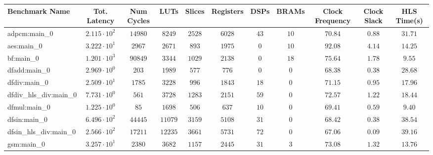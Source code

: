 \begin{tabular}{|l|c|c|c|c|c|c|c|c|c|c|}
\hline
Benchmark Name          & Tot. Latency           & Num Cycles & LUTs      & Slices    & Registers & DSPs    & BRAMs   & Clock Frequency & Clock Slack & HLS Time(s) \\
\hline
adpcm:main\_0           & $ 2.115 \cdot 10^{2} $ & $ 14980  $ & $ 8249  $ & $ 2528  $ & $ 6028  $ & $ 43  $ & $ 10  $ & $ 70.84       $ & $ 0.88    $ & $ 31.71   $ \\
aes:main\_0             & $ 3.222 \cdot 10^{1} $ & $ 2967   $ & $ 2671  $ & $ 893   $ & $ 1975  $ & $ 0   $ & $ 10  $ & $ 92.08       $ & $ 4.14    $ & $ 14.25   $ \\
bf:main\_0              & $ 1.201 \cdot 10^{3} $ & $ 90849  $ & $ 3344  $ & $ 1029  $ & $ 2138  $ & $ 0   $ & $ 18  $ & $ 75.64       $ & $ 1.78    $ & $ 9.55    $ \\
dfadd:main\_0           & $ 2.969 \cdot 10^{0} $ & $ 203    $ & $ 1989  $ & $ 577   $ & $ 776   $ & $ 0   $ & $ 0   $ & $ 68.38       $ & $ 0.38    $ & $ 28.68   $ \\
dfdiv:main\_0           & $ 2.509 \cdot 10^{1} $ & $ 1785   $ & $ 3228  $ & $ 996   $ & $ 1843  $ & $ 18  $ & $ 0   $ & $ 71.15       $ & $ 0.95    $ & $ 17.96   $ \\
dfdiv\_hls\_div:main\_0 & $ 7.731 \cdot 10^{0} $ & $ 561    $ & $ 3728  $ & $ 1283  $ & $ 2151  $ & $ 59  $ & $ 0   $ & $ 72.57       $ & $ 1.22    $ & $ 18.44   $ \\
dfmul:main\_0           & $ 1.225 \cdot 10^{0} $ & $ 85     $ & $ 1698  $ & $ 506   $ & $ 637   $ & $ 10  $ & $ 0   $ & $ 69.41       $ & $ 0.59    $ & $ 9.40    $ \\
dfsin:main\_0           & $ 6.496 \cdot 10^{2} $ & $ 44445  $ & $ 11079 $ & $ 3159  $ & $ 5108  $ & $ 31  $ & $ 0   $ & $ 68.42       $ & $ 0.38    $ & $ 38.54   $ \\
dfsin\_hls\_div:main\_0 & $ 2.566 \cdot 10^{2} $ & $ 17211  $ & $ 12235 $ & $ 3661  $ & $ 5731  $ & $ 72  $ & $ 0   $ & $ 67.06       $ & $ 0.09    $ & $ 39.16   $ \\
gsm:main\_0             & $ 3.257 \cdot 10^{1} $ & $ 2380   $ & $ 3682  $ & $ 1157  $ & $ 2445  $ & $ 31  $ & $ 3   $ & $ 73.08       $ & $ 1.32    $ & $ 13.76   $ \\

\end{tabular}
